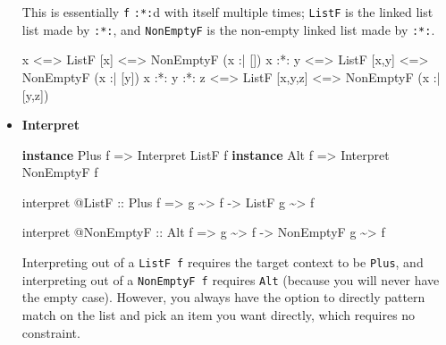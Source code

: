 \documentclass[]{article}
\newenvironment{Shaded}{}{}
\newcommand{\DataTypeTok}[1]{\textcolor[rgb]{0.56,0.13,0.00}{#1}}
\newcommand{\KeywordTok}[1]{\textcolor[rgb]{0.00,0.44,0.13}{\textbf{#1}}}
\newcommand{\NormalTok}[1]{#1}
\newcommand{\OperatorTok}[1]{\textcolor[rgb]{0.40,0.40,0.40}{#1}}
\newcommand{\OtherTok}[1]{\textcolor[rgb]{0.00,0.44,0.13}{#1}}
\begin{document}
\begin{itemize}
  This is essentially \texttt{f} \texttt{:*:}d with itself multiple times;
  \texttt{ListF} is the linked list list made by \texttt{:*:}, and
  \texttt{NonEmptyF} is the non-empty linked list made by \texttt{:*:}.

\begin{Shaded}
\begin{Highlighting}[]
\NormalTok{x             }\OperatorTok{<=>} \DataTypeTok{ListF}\NormalTok{ [x]     }\OperatorTok{<=>} \DataTypeTok{NonEmptyF}\NormalTok{ (x }\OperatorTok{:|}\NormalTok{ [])}
\NormalTok{x }\OperatorTok{:*:}\NormalTok{ y       }\OperatorTok{<=>} \DataTypeTok{ListF}\NormalTok{ [x,y]   }\OperatorTok{<=>} \DataTypeTok{NonEmptyF}\NormalTok{ (x }\OperatorTok{:|}\NormalTok{ [y])}
\NormalTok{x }\OperatorTok{:*:}\NormalTok{ y }\OperatorTok{:*:}\NormalTok{ z }\OperatorTok{<=>} \DataTypeTok{ListF}\NormalTok{ [x,y,z] }\OperatorTok{<=>} \DataTypeTok{NonEmptyF}\NormalTok{ (x }\OperatorTok{:|}\NormalTok{ [y,z])}
\end{Highlighting}
\end{Shaded}
\item
  \textbf{Interpret}

\begin{Shaded}
\begin{Highlighting}[]
\KeywordTok{instance} \DataTypeTok{Plus}\NormalTok{ f }\OtherTok{=>} \DataTypeTok{Interpret} \DataTypeTok{ListF}\NormalTok{     f}
\KeywordTok{instance} \DataTypeTok{Alt}\NormalTok{  f }\OtherTok{=>} \DataTypeTok{Interpret} \DataTypeTok{NonEmptyF}\NormalTok{ f}

\NormalTok{interpret }\OperatorTok{@}\DataTypeTok{ListF}
\OtherTok{    ::} \DataTypeTok{Plus}\NormalTok{ f}
    \OtherTok{=>}\NormalTok{ g }\OperatorTok{\textasciitilde{}>}\NormalTok{ f}
    \OtherTok{{-}>} \DataTypeTok{ListF}\NormalTok{ g }\OperatorTok{\textasciitilde{}>}\NormalTok{ f}

\NormalTok{interpret }\OperatorTok{@}\DataTypeTok{NonEmptyF}
\OtherTok{    ::} \DataTypeTok{Alt}\NormalTok{ f}
    \OtherTok{=>}\NormalTok{ g }\OperatorTok{\textasciitilde{}>}\NormalTok{ f}
    \OtherTok{{-}>} \DataTypeTok{NonEmptyF}\NormalTok{ g }\OperatorTok{\textasciitilde{}>}\NormalTok{ f}
\end{Highlighting}
\end{Shaded}

  Interpreting out of a \texttt{ListF\ f} requires the target context to be
  \texttt{Plus}, and interpreting out of a \texttt{NonEmptyF\ f} requires
  \texttt{Alt} (because you will never have the empty case). However, you always
  have the option to directly pattern match on the list and pick an item you
  want directly, which requires no constraint.
\end{itemize}
\end{document}
